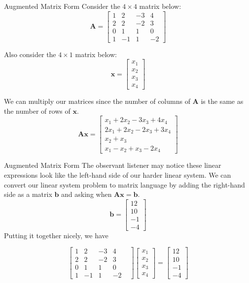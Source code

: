 \documentclass{beamer}
\begin{document}
\begin{frame}{Augmented Matrix Form}
Consider the \(4 \times 4\) matrix below:
\[
\mathbf{A} =
\begin{bmatrix}
    1 & 2 & -3 & 4 \\
    2 & 2 & -2 & 3 \\
    0 & 1 & 1 & 0 \\
    1 & -1 & 1 & -2
\end{bmatrix}
\]

Also consider the \(4 \times 1\) matrix below:
\[
\mathbf{x} =
\begin{bmatrix}
    x_1 \\
    x_2 \\
    x_3 \\
    x_4
\end{bmatrix}
\]

We can multiply our matrices since the number of columns of $\mathbf{A}$ is the same as the number of rows of $\mathbf{x}$.
\[
\mathbf{A}\mathbf{x} =
\begin{bmatrix}
    x_1 + 2x_2 - 3x_3 + 4x_4 \\
    2x_1 + 2x_2 - 2x_3 + 3x_4 \\
    x_2 + x_3 \\
    x_1 - x_2 + x_3 - 2x_4
\end{bmatrix}
\]
\end{frame}

\begin{frame}{Augmented Matrix Form}
The observant listener may notice these linear expressions look like the left-hand side of our harder linear system. We can convert our linear system problem to matrix language by adding the right-hand side as a matrix $\mathbf{b}$ and asking when $\mathbf{A}\mathbf{x} = \mathbf{b}$.
\[
\mathbf{b} =
\begin{bmatrix}
    12 \\
    10 \\
    -1 \\
    -4
\end{bmatrix}
\]
Putting it together nicely, we have

\[
\begin{bmatrix}
    1 & 2 & -3 & 4 & \\
    2 & 2 & -2 & 3 & \\
    0 & 1 & 1 & 0 & \\
    1 & -1 & 1 & -2 & 
\end{bmatrix}
\begin{bmatrix}
    x_1 \\
    x_2 \\
    x_3 \\
    x_4
\end{bmatrix}
=
\begin{bmatrix}
    12 \\
    10 \\
    -1 \\
    -4
\end{bmatrix}
\]  
\end{frame}
\end{document}
